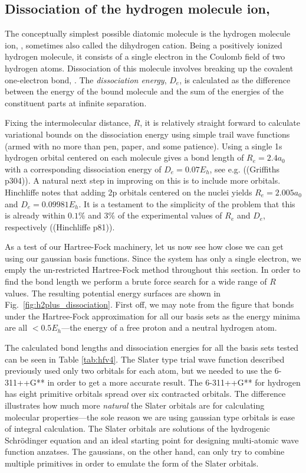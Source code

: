 \documentclass[a4paper]{article}
\newcommand{\fig}[1]{Fig.\ \ref{fig:#1}}
\newcommand{\tab}[1]{Table \ref{tab:#1}}
\begin{document}
\subsection{Dissociation of the hydrogen molecule ion, \texorpdfstring{}{H2+}}
The conceptually simplest possible diatomic molecule is the hydrogen molecule ion, , sometimes also called the dihydrogen cation. Being a positively ionized hydrogen molecule, it consists of a single electron in the Coulomb field of two hydrogen atoms. Dissociation of this molecule involves breaking up the covalent one-electron bond, . The \emph{dissociation energy}, $D_e$, is calculated as the difference between the energy of the bound molecule and the sum of the energies of the constituent parts at infinite separation.

Fixing the intermolecular distance, $R$, it is relatively straight forward to calculate variational bounds on the dissociation energy using simple trail wave functions (armed with no more than pen, paper, and some patience). Using a single 1s hydrogen orbital centered on each molecule gives a bond length of $R_e=2.4a_0$ with a corresponding dissociation energy of $D_e=0.07E_h$, see e.g. ((Griffiths p304)). A natural next step in improving on this is to include more orbitals. Hinchliffe notes that adding 2p orbitals centered on the nuclei yields $R_e=2.005a_0$ and $D_e=0.09981E_h$. It is a testament to the simplicity of the problem that this is already within $0.1\%$ and $3\%$ of the experimental values of $R_e$ and $D_e$, respectively ((Hinchliffe p81)).

As a test of our Hartree-Fock machinery, let us now see how close we can get using our gaussian basis functions. Since the system has only a single electron, we emply the un-restricted Hartree-Fock method throughout this section. In order to find the bond length we perform a brute force search for a wide range of $R$ values. The resulting potential energy surfaces are shown in \fig{h2plus_dissociation}. First off, we may note from the figure that  bonds under the Hartree-Fock approximation for all our basis sets as the energy minima are all $<0.5E_h$\----the energy of a free proton and a neutral hydrogen atom.

The calculated bond lengths and dissociation energies for all the basis sets tested can be seen in \tab{hfv4}. The Slater type trial wave function described previously used only two orbitals for each atom, but we needed to use the 6-311++G** in order to get a more accurate result. The 6-311++G** for hydrogen has eight primitive orbitals spread over six contracted orbitals. The difference illustrates how much more \emph{natural} the Slater orbitals are for calculating molecular properties\----the sole reason we are using gaussian type orbitals is ease of integral calculation. The Slater orbitals are solutions of the hydrogenic Schrödinger equation and an ideal starting point for designing multi-atomic wave function anzatses. The gaussians, on the other hand, can only try to combine multiple primitives in order to emulate the form of the Slater orbitals.
\end{document}

